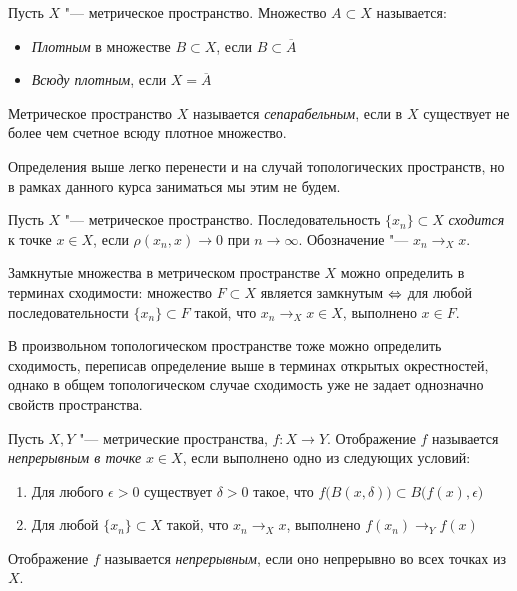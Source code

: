 \begin{definition}
	Пусть $X$ "--- метрическое пространство. Множество $A \subset X$ называется:
	\begin{itemize}
		\item \textit{Плотным} в множестве $B \subset X$, если $B \subset \overline {A}$
 
		\item \textit{Всюду плотным}, если $X = \overline {A}$
	\end{itemize}
\end{definition}

\begin{definition}
	Метрическое пространство $X$ называется \textit{сепарабельным}, если в $X$ существует не более чем счетное всюду плотное множество.
\end{definition}

\begin{note}
	Определения выше легко перенести и на случай топологических пространств, но в рамках данного курса заниматься мы этим не будем.
\end{note}

\begin{definition}
	Пусть $X$ "--- метрическое пространство. Последовательность $\{x_n\} \subset X$ \textit{сходится} к точке $x \in X$, если $\rho(x_n, x) \to 0$ при $n \to \infty$. Обозначение "--- $x_n \to_X x$.
\end{definition}

\begin{note}
	Замкнутые множества в метрическом пространстве $X$ можно определить в терминах сходимости: множество $F \subset X$ является замкнутым $\Leftrightarrow$ для любой последовательности $\{x_n\} \subset F$ такой, что $x_n \to_X x \in X$, выполнено $x \in F$.
\end{note}

\begin{note}
	В произвольном топологическом пространстве тоже можно определить сходимость, переписав определение выше в терминах открытых окрестностей, однако в общем топологическом случае сходимость уже не задает однозначно свойств пространства.
\end{note}

\begin{definition}
	Пусть $X, Y$ "--- метрические пространства, $f : X \to Y$. Отображение $f$ называется \textit{непрерывным в точке} $x \in X$, если выполнено одно из следующих условий:
	\begin{enumerate}
		\item Для любого $\epsilon > 0$ существует $\delta > 0$ такое, что $f\big(B(x, \delta)\big) \subset B\big(f(x), \epsilon\big)$
		
		\item Для любой $\{x_n\} \subset X$ такой, что $x_n \to_X x$, выполнено $f(x_n) \to_Y f(x)$
	\end{enumerate}

	Отображение $f$ называется \textit{непрерывным}, если оно непрерывно во всех точках из $X$.
\end{definition}

